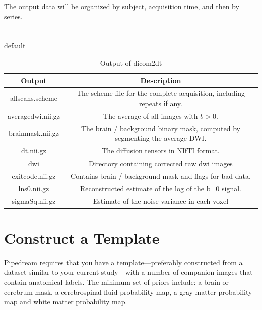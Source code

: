 \documentclass{InsightArticle}
\begin{document}
The output data will be organized by subject, acquisition time, and then by series. 

\section{}

\begin{table}[htdp]
\caption{default}
\begin{center}
\begin{tabular}{|c|c|}
\hline
\textbf{Output} & \textbf{Description} \\ \hline
allscans.scheme & The scheme file for the complete acquisition, including repeats if any. \\ \hline
averagedwi.nii.gz & The average of all images with $b > 0$. \\ \hline
brainmask.nii.gz & The brain / background binary mask, computed by segmenting the average DWI. \\ \hline
dt.nii.gz         & The diffusion tensors in NIfTI format. \\ \hline
dwi               & Directory containing corrected raw dwi images \\ \hline
exitcode.nii.gz   & Contains brain / background mask and flags for bad data. \\ \hline
lns0.nii.gz       & Reconstructed estimate of the log of the b=0 signal. \\ \hline
sigmaSq.nii.gz    & Estimate of the noise variance in each voxel \\ \hline
\end{tabular}
\end{center}
\label{dicom2dtout}
\caption{Output of dicom2dt}
\end{table}%


\section{Construct a Template}
Pipedream requires that you have a template---preferably constructed
from a dataset similar to your current study---with a number of
companion images that contain anatomical labels.  The minimum set of
priors include: a brain or cerebrum mask, a cerebrospinal fluid
probability map, a gray matter probability map and white matter
probability map.
\end{document}

